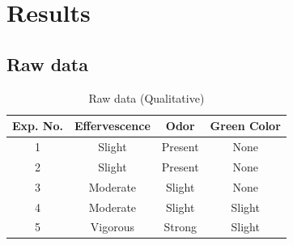 \documentclass[a4paper]{article}
\begin{document}
\section{Results}

\subsection{Raw data}
\begin{table}[ht]
\centering
\caption{Raw data (Qualitative)}
\begin{tabular}{cccc}
\hline
    \textbf{Exp. No.} & \textbf{Effervescence} & \textbf{Odor} & \textbf{Green Color} \\ \hline
    1 & Slight & Present & None \\
    2 & Slight & Present & None \\
    3 & Moderate & Slight & None \\
    4 & Moderate & Slight & Slight \\
    5 & Vigorous & Strong & Slight \\
    \hline
\end{tabular}
\end{table}
\end{document}
